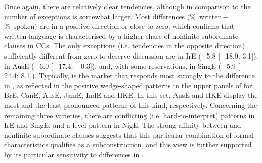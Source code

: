 Once again, there are relatively clear tendencies, although in comparison to  the number of exceptions is somewhat larger. Most differences (\%~written\,$-$\,\%~spoken) are in a positive direction or close to zero, which confirms that written language is characterised by a higher share of nonfinite subordinate clauses in CCs. The only exceptions (i.e. tendencies in the opposite direction) sufficiently different from zero to deserve discussion are  in IrE ($-$5.8 [$-$18.0; 3.1]),  in AusE ($-$6.0 [$-$17.4; $-$0.3]), and, with some reservations,  in SingE ($-$5.9 [$-$24.4; 8.1]).   Typically,  is the marker that responds most strongly to the difference in , as reflected in the positive wedge-shaped patterns in the upper panels of  for BrE, CanE, AusE, JamE, IndE and HKE. In this set, AusE and HKE display the most and the least pronounced patterns of this kind, respectively. Concerning the remaining three varieties, there are conflicting (i.e. hard-to-interpret) patterns in IrE and SingE, and a level pattern in NigE. The strong affinity between  and nonfinite subordinate clauses suggests that this particular combination of formal characteristics qualifies as a subconstruction, and this view is further supported by its particular sensitivity to differences in .

